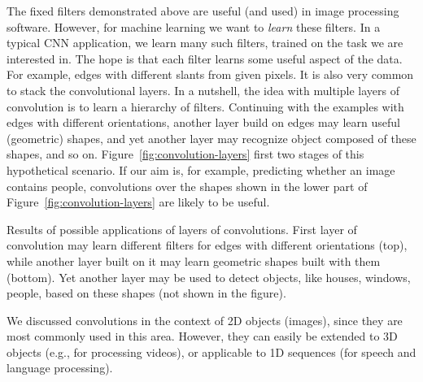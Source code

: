 The fixed filters demonstrated above are useful (and used)
in image processing software.
However, for machine learning we want to \emph{learn} these filters.
In a typical CNN application, we learn many such filters,
trained on the task we are interested in.%
The hope is that each filter learns some useful aspect of the data.
For example, edges with different slants from given pixels.
It is also very common to stack the convolutional layers.
In a nutshell,
the idea with multiple layers of convolution is to
learn a hierarchy of filters.
Continuing with the examples with edges with different orientations,
another layer build on edges may learn useful (geometric) shapes,
and yet another layer may recognize object composed of these shapes,
and so on.
Figure~\ref{fig:convolution-layers} first two stages
of this hypothetical scenario.
If our aim is, for example, predicting whether an image contains people,
convolutions over the shapes
shown in the lower part of Figure~\ref{fig:convolution-layers}
are likely to  be useful.
\begin{marginfigure}
  \centering
  \begin{tcolorbox}
          \tikzset{external/export next=false}
    \tcblower
          \tikzset{external/export next=false}
  \end{tcolorbox}
  \caption{Results of possible applications of layers of convolutions.
    First layer of convolution may learn different filters for
    edges with different orientations (top),
    while another layer built on it may learn geometric shapes built with them
    (bottom).
    Yet another layer may be used to detect objects,
    like houses, windows, people,
    based on these shapes (not shown in the figure).
  }
  \label{fig:convolution-layers}
\end{marginfigure}

We discussed convolutions in the context of 2D objects (images),
since they are most commonly used in this area.
However, they can easily be extended to 3D objects
(e.g., for processing videos),
or applicable to 1D sequences (for speech and language processing).

